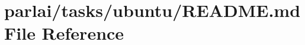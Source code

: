 \hypertarget{parlai_2tasks_2ubuntu_2README_8md}{}\section{parlai/tasks/ubuntu/\+R\+E\+A\+D\+ME.md File Reference}
\label{parlai_2tasks_2ubuntu_2README_8md}
